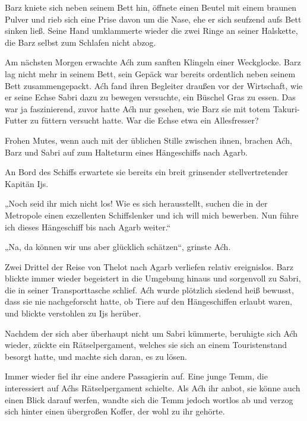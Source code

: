 Barz kniete sich neben seinem Bett hin, öffnete einen Beutel mit einem braunen Pulver und rieb sich eine Prise davon um die Nase, ehe er sich seufzend aufs Bett sinken ließ. Seine Hand umklammerte wieder die zwei Ringe an seiner Halskette, die Barz selbst zum Schlafen nicht abzog.

Am nächsten Morgen erwachte Aćh zum sanften Klingeln einer Weckglocke. Barz lag nicht mehr in seinem Bett, sein Gepäck war bereits ordentlich neben seinem Bett zusammengepackt. Aćh fand ihren Begleiter draußen vor der Wirtschaft, wie er seine Echse Sabri dazu zu bewegen versuchte, ein Büschel Gras zu essen. Das war ja faszinierend, zuvor hatte Aćh nur gesehen, wie Barz sie mit totem Takuri-Futter zu füttern versucht hatte. War die Echse etwa ein Allesfresser?

Frohen Mutes, wenn auch mit der üblichen Stille zwischen ihnen, brachen Aćh, Barz und Sabri auf zum Halteturm eines Hängeschiffs nach Agarb.

An Bord des Schiffs erwartete sie bereits ein breit grinsender stellvertretender Kapitän Ijs.

„Noch seid ihr mich nicht los! Wie es sich herausstellt, suchen die in der Metropole einen exzellenten Schiffslenker und ich will mich bewerben. Nun führe ich dieses Hängeschiff bis nach Agarb weiter.“

„Na, da können wir uns aber glücklich schätzen“, grinste Aćh.\bigskip







Zwei Drittel der Reise von Thelot nach Agarb verliefen relativ ereignislos. Barz blickte immer wieder begeistert in die Umgebung hinaus und sorgenvoll zu Sabri, die in seiner Transporttasche schlief. Aćh wurde plötzlich siedend heiß bewusst, dass sie nie nachgeforscht hatte, ob Tiere auf den Hängeschiffen erlaubt waren, und blickte verstohlen zu Ijs herüber.

Nachdem der sich aber überhaupt nicht um Sabri kümmerte, beruhigte sich Aćh wieder, zückte ein Rätselpergament, welches sie sich an einem Touristenstand besorgt hatte, und machte sich daran, es zu lösen.

Immer wieder fiel ihr eine andere Passagierin auf. Eine junge Temm, die interessiert auf Aćhs Rätselpergament schielte. Als Aćh ihr anbot, sie könne auch einen Blick darauf werfen, wandte sich die Temm jedoch wortlos ab und verzog sich hinter einen übergroßen Koffer, der wohl zu ihr gehörte.

